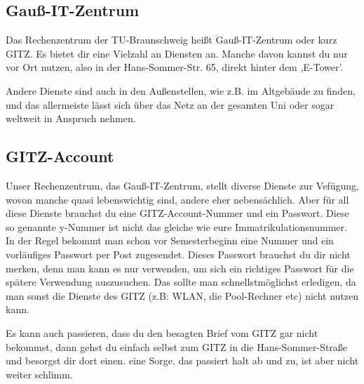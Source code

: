 \subsection{Gauß-IT-Zentrum}

	Das Rechenzentrum der TU-Braunschweig heißt Gauß-IT-Zentrum oder kurz GITZ. Es bietet dir eine Vielzahl an Diensten an. Manche davon kannst du nur vor Ort nutzen, also in der Hans-Sommer-Str. 65, direkt hinter dem ,E-Tower'. 

	Andere Dienste sind auch in den Außenstellen, wie z.B. im
	Altgebäude zu finden, und das allermeiste lässt sich über das Netz an der gesamten Uni oder sogar weltweit in Anspruch nehmen.

\subsection{GITZ-Account}
\label{todogitz}
	Unser Rechenzentrum, das Gauß-IT-Zentrum, stellt  diverse
	Dienste zur Vefügung, wovon manche quasi lebenswichtig sind,
	andere eher nebensächlich. Aber für all diese Dienste brauchst du eine GITZ-Account-Nummer und ein Passwort. Diese so genannte y-Nummer ist nicht das gleiche wie eure Immatrikulationsnummer. In der Regel bekommt man schon vor 
	Semesterbeginn eine Nummer und ein vorläufiges Passwort per Post
	zugesendet. Dieses Passwort brauchst du dir nicht merken, denn man kann es nur verwenden, um  sich ein richtiges Passwort für die spätere Verwendung auszusuchen.
	Das sollte man schnellstmöglichst erledigen, da man sonst die
	Dienste des GITZ (z.B: WLAN, die Pool-Rechner etc) nicht nutzen
	kann. 

	Es kann auch passieren, dass du den besagten Brief vom GITZ  gar
	nicht bekommst, dann gehst du einfach selbst zum GITZ in die
	Hans-Sommer-Straße und besorgst dir dort einen. eine Sorge, das passiert halt ab und zu, ist aber nicht weiter schlimm.

